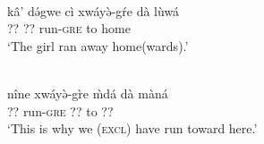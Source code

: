 \ea\label{ex2:dghw1}
 \\
\gll 	kâ' də́gwe cì xwáyə̀-gŕe dà lùwá	\\
 ?? ?? run-\textsc{gre} to home	\\
\glt `The girl ran away home(wards).'

\ex\label{ex2:dghw2}
 \\
\gll nîne xwáyə̀-gr̀e m̀dá dà màná \\
?? run-\textsc{gre} ?? to ?? 	\\
\glt `This is why we (\textsc{excl}) have run toward here.'
\z 


